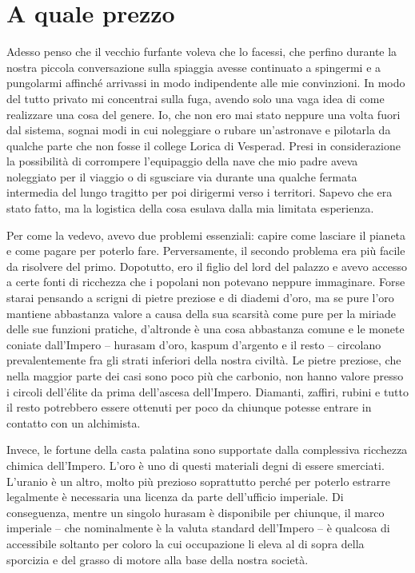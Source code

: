 \chapter{A quale prezzo}

Adesso penso che il vecchio furfante voleva che lo facessi, che perfino
durante la nostra piccola conversazione sulla spiaggia avesse continuato
a spingermi e a pungolarmi affinché arrivassi in modo indipendente alle
mie convinzioni. In modo del tutto privato mi concentrai sulla fuga,
avendo solo una vaga idea di come realizzare una cosa del genere. Io,
che non ero mai stato neppure una volta fuori dal sistema, sognai modi
in cui noleggiare o rubare un'astronave e pilotarla da qualche parte che
non fosse il college Lorica di Vesperad. Presi in considerazione la
possibilità di corrompere l'equipaggio della nave che mio padre aveva
noleggiato per il viaggio o di sgusciare via durante una qualche fermata
intermedia del lungo tragitto per poi dirigermi verso i territori.
Sapevo che era stato fatto, ma la logistica della cosa esulava dalla mia
limitata esperienza.

Per come la vedevo, avevo due problemi essenziali: capire come lasciare
il pianeta e come pagare per poterlo fare. Perversamente, il secondo
problema era più facile da risolvere del primo. Dopotutto, ero il figlio
del lord del palazzo e avevo accesso a certe fonti di ricchezza che i
popolani non potevano neppure immaginare. Forse starai pensando a
scrigni di pietre preziose e di diademi d'oro, ma se pure l'oro mantiene
abbastanza valore a causa della sua scarsità come pure per la miriade
delle sue funzioni pratiche, d'altronde è una cosa abbastanza comune e
le monete coniate dall'Impero -- hurasam d'oro, kaspum d'argento e il
resto -- circolano prevalentemente fra gli strati inferiori della nostra
civiltà. Le pietre preziose, che nella maggior parte dei casi sono poco
più che carbonio, non hanno valore presso i circoli dell'élite da prima
dell'ascesa dell'Impero. Diamanti, zaffiri, rubini e tutto il resto
potrebbero essere ottenuti per poco da chiunque potesse entrare in
contatto con un alchimista.

Invece, le fortune della casta palatina sono supportate dalla
complessiva ricchezza chimica dell'Impero. L'oro è uno di questi
materiali degni di essere smerciati. L'uranio è un altro, molto più
prezioso soprattutto perché per poterlo estrarre legalmente è necessaria
una licenza da parte dell'ufficio imperiale. Di conseguenza, mentre un
singolo hurasam è disponibile per chiunque, il marco imperiale -- che
nominalmente è la valuta standard dell'Impero -- è qualcosa di
accessibile soltanto per coloro la cui occupazione li eleva al di sopra
della sporcizia e del grasso di motore alla base della nostra società.

